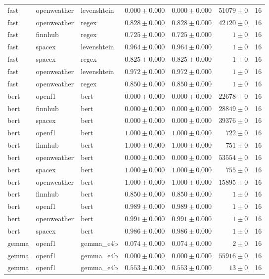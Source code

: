 \begin{table}[htbp]
\begin{tabular}{l l l r r r r}
fast & openweather & levenshtein & $0.000\pm0.000$ & $0.000\pm0.000$ & $51079\pm0$ & 16 \\
fast & openweather & regex & $0.828\pm0.000$ & $0.828\pm0.000$ & $42120\pm0$ & 16 \\
fast & finnhub & regex & $0.725\pm0.000$ & $0.725\pm0.000$ & $1\pm0$ & 16 \\
fast & spacex & levenshtein & $0.964\pm0.000$ & $0.964\pm0.000$ & $1\pm0$ & 16 \\
fast & spacex & regex & $0.825\pm0.000$ & $0.825\pm0.000$ & $1\pm0$ & 16 \\
fast & openweather & levenshtein & $0.972\pm0.000$ & $0.972\pm0.000$ & $1\pm0$ & 16 \\
fast & openweather & regex & $0.850\pm0.000$ & $0.850\pm0.000$ & $1\pm0$ & 16 \\
bert & openf1 & bert & $0.000\pm0.000$ & $0.000\pm0.000$ & $22678\pm0$ & 16 \\
bert & finnhub & bert & $0.000\pm0.000$ & $0.000\pm0.000$ & $28849\pm0$ & 16 \\
bert & spacex & bert & $0.000\pm0.000$ & $0.000\pm0.000$ & $39376\pm0$ & 16 \\
bert & openf1 & bert & $1.000\pm0.000$ & $1.000\pm0.000$ & $722\pm0$ & 16 \\
bert & finnhub & bert & $1.000\pm0.000$ & $1.000\pm0.000$ & $751\pm0$ & 16 \\
bert & openweather & bert & $0.000\pm0.000$ & $0.000\pm0.000$ & $53554\pm0$ & 16 \\
bert & spacex & bert & $1.000\pm0.000$ & $1.000\pm0.000$ & $755\pm0$ & 16 \\
bert & openweather & bert & $1.000\pm0.000$ & $1.000\pm0.000$ & $15895\pm0$ & 16 \\
bert & finnhub & bert & $0.850\pm0.000$ & $0.850\pm0.000$ & $1\pm0$ & 16 \\
bert & openf1 & bert & $0.989\pm0.000$ & $0.989\pm0.000$ & $1\pm0$ & 16 \\
bert & openweather & bert & $0.991\pm0.000$ & $0.991\pm0.000$ & $1\pm0$ & 16 \\
bert & spacex & bert & $0.986\pm0.000$ & $0.986\pm0.000$ & $1\pm0$ & 16 \\
gemma & openf1 & gemma\_e4b & $0.074\pm0.000$ & $0.074\pm0.000$ & $2\pm0$ & 16 \\
gemma & openf1 & gemma\_e4b & $0.000\pm0.000$ & $0.000\pm0.000$ & $55916\pm0$ & 16 \\
gemma & openf1 & gemma\_e4b & $0.553\pm0.000$ & $0.553\pm0.000$ & $13\pm0$ & 16 \\

\end{tabular}
\end{table}
